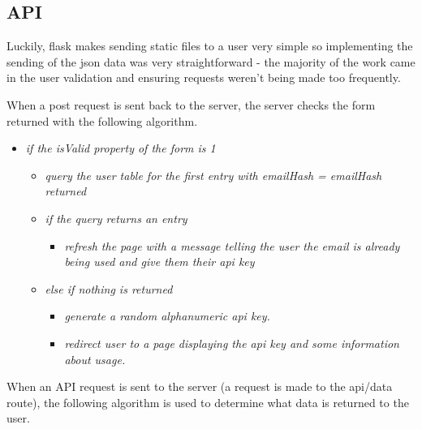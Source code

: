         \subsection{API}

        Luckily, flask makes sending static files to a user very simple so implementing the sending of the json data was very straightforward - the majority of the work came in the user validation and ensuring requests weren't being made too frequently.

        When a post request is sent back to the server, the server checks the form returned with the following algorithm.

        \begin{itemize}
            \item \textit{if the isValid property of the form is 1}
            \begin{itemize}
                \item \textit{query the user table for the first entry with emailHash = emailHash returned}
                \item \textit{if the query returns an entry}
                \begin{itemize}
                    \item \textit{refresh the page with a message telling the user the email is already being used and give them their api key}
                \end{itemize}
                \item \textit{else if nothing is returned}
                \begin{itemize}
                    \item \textit{generate a random alphanumeric api key.}
                    \item \textit{redirect user to a page displaying the api key and some information about usage.}
                \end{itemize}
            \end{itemize}
        \end{itemize}

        When an API request is sent to the server (a request is made to the api/data route), the following algorithm is used to determine what data is returned to the user.

